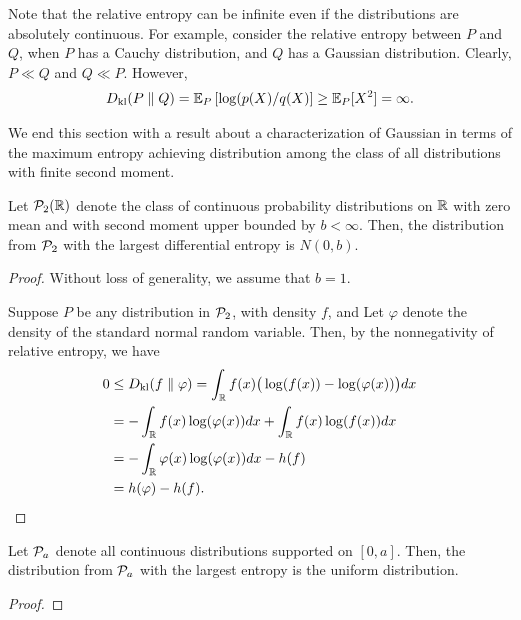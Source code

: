         \begin{example}
            Note that the relative entropy can be infinite even if the distributions are absolutely continuous. For example, consider the relative entropy between $P$ and $Q$, when $P$ has a Cauchy distribution, and $Q$ has a Gaussian distribution. Clearly, $P \ll Q$ and $Q\ll P$. However, 
            \begin{align}
                D_{\text{kl}}(P\parallel Q) = \mathbb{E}_P\left[  \log(p(X)/q(X) \right] \geq \mathbb{E}_P[X^2] = \infty. 
            \end{align}
        \end{example}
        We end this section with a result about a characterization of Gaussian in terms of the maximum entropy achieving distribution among the class of all distributions with finite second moment. 
        \begin{proposition}
            \label{prop:max-ent-1} Let $\mathcal{P}_2(\mathbb{R})$ denote the class of continuous probability distributions on $\mathbb{R}$ with zero mean and with second moment upper bounded by $b<\infty$. Then, the distribution from $\mathcal{P}_2$ with the largest differential entropy is $N(0, b)$. 
        \end{proposition}
        \begin{proof}
            Without loss of generality, we assume that $b=1$. 
            
            Suppose $P$ be any distribution in $\mathcal{P}_2$, with density $f$, and Let $\varphi$ denote the density of the standard normal random variable. Then, by the nonnegativity of relative entropy, we have 
            \begin{align}
                0 & \leq D_{\text{kl}}(f \parallel \varphi)  = \int_{\mathbb{R}} f(x) \big(\log(f(x))  - \log(\varphi(x)) \big) dx \\
                & = -\int_{\mathbb{R}} f(x) \log(\varphi(x)) dx + \int_{\mathbb{R}} f(x) \log(f(x)) dx \\
                & = -\int_{\mathbb{R}} \varphi(x) \log(\varphi(x)) dx - h(f) \\
                & = h(\varphi) - h(f). 
            \end{align}
        \end{proof}

        \begin{proposition}
            \label{prop:max-ent-2} Let $\mathcal{P}_a$ denote all continuous distributions supported on $[0, a]$. Then, the distribution from $\mathcal{P}_a$ with the largest entropy is the uniform distribution. 
        \end{proposition}
        \begin{proof}
            
        \end{proof}

